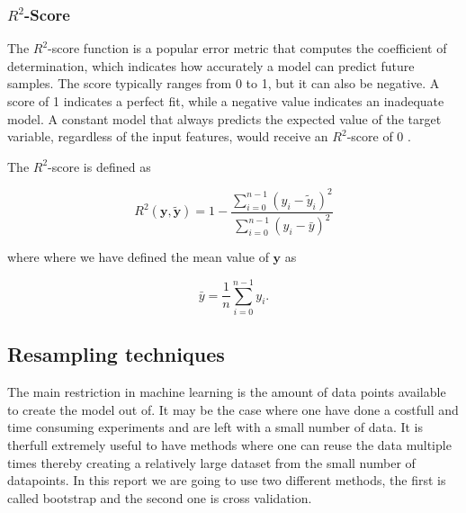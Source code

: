 \subsubsection{$R^2$-Score}

\noindent The $R^2$-score function is a popular error metric that computes the coefficient of determination, which indicates how
accurately a model can predict future samples. The score typically ranges from 0 to 1, but it can also be negative. A score of 1 indicates
a perfect fit, while a negative value indicates an inadequate model. A constant model that always predicts the expected value of the target
variable, regardless of the input features, would receive an $R^2$-score of 0 \cite{Week34}.

\noindent The $R^2$-score is defined as 

\begin{equation}\label{eqR2} 
R^2(\boldsymbol{y}, \tilde{\boldsymbol{y}}) = 1 - \frac{\sum_{i=0}^{n - 1} (y_i - \tilde{y}_i)^2}{\sum_{i=0}^{n - 1} (y_i - \bar{y})^2}
\end{equation}

\noindent where where we have defined the mean value of $\boldsymbol{y}$ as

\begin{equation} 
\bar{y} =  \frac{1}{n} \sum_{i=0}^{n - 1} y_i.
\end{equation}



\subsection{Resampling techniques}

\noindent The main restriction in machine learning is 
the amount of data points available to create the model out of. It may be the case where one have
done a costfull and time consuming experiments and are left with a small number of data. 
It is therfull extremely useful to have methods where one can reuse the data multiple times
thereby creating a relatively large dataset from the small number of datapoints. In this report
we are going to use two different methods, the first is called bootstrap and the second one is cross validation.

